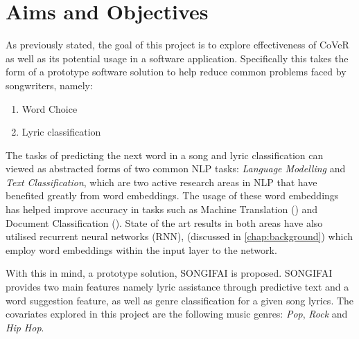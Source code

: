 \section{Aims and Objectives}
\noindent
\newline
As previously stated, the goal of this project is to explore effectiveness of CoVeR as well as its potential usage in a software application. Specifically this takes the form of a prototype software solution to help reduce common problems faced by songwriters, namely:

\begin{enumerate}
	\item Word Choice 
	\item Lyric classification
\end{enumerate}

\noindent
\newline
The tasks of predicting the next word in a song and lyric classification can viewed as abstracted forms of two common NLP tasks: \textit{Language Modelling} and \textit{Text Classification}, which are two active research areas in NLP that have benefited greatly from word embeddings. The usage of these word embeddings has helped improve accuracy in tasks such as Machine Translation (\cite{Qi2018}) and Document Classification (\cite{Manning2008}). State of the art results in both areas have also utilised recurrent neural networks (RNN), (discussed in \autoref{chap:background}) which employ word embeddings within the input layer to the network.

\noindent
\newline
With this in mind, a prototype solution, SONGIFAI is proposed. SONGIFAI provides two main features namely lyric assistance through predictive text and a word suggestion feature, as well as genre classification for a given song lyrics. The covariates explored in this project are the following music genres: \textit{Pop}, \textit{Rock} and \textit{Hip Hop}. 

